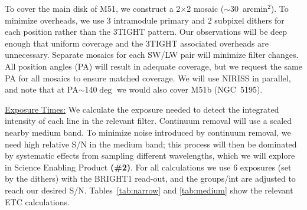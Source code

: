 \documentclass[12pt]{article}
\begin{document}
To cover the main disk of M51, we construct a 2$\times$2 mosaic ($\sim$30~arcmin$^2$). To minimize overheads, we use 3 intramodule primary and 2 subpixel dithers for each position rather than the 3TIGHT pattern. Our observations will be deep enough that uniform coverage and the 3TIGHT associated overheads are unnecessary.  
Separate mosaics for each SW/LW pair will minimize filter changes. All position angles (PA) will result in adequate coverage, but we request the same PA for all mosaics to ensure matched coverage. We will use NIRISS in parallel, and note that at PA$\sim$140$\deg$ we would also cover M51b (NGC~5195).

\vspace{0.05in}

\noindent \underline{Exposure Times:} We calculate the exposure needed to detect the integrated intensity of each line in the relevant filter. Continuum removal will use a scaled nearby medium band. To minimize noise introduced by continuum removal, we need high relative S/N in the medium band; this process will then be dominated by systematic effects from sampling different wavelengths, which we will explore in Science Enabling Product {\bf (\#2)}. 
For all calculations we use 6 exposures (set by the dithers) with the BRIGHT1 read-out, 
and the groups/int are adjusted to reach our desired S/N. Tables~\ref{tab:narrow} and \ref{tab:medium} show the relevant ETC calculations.

\vspace{-\baselineskip}
\end{document}

